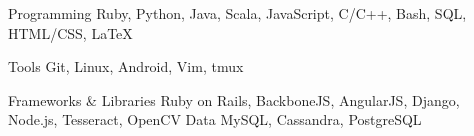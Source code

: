 

\begin{cvskills}

  \cvskill
    {Programming} %
    {Ruby, Python, Java, Scala, JavaScript, C/C++, Bash, SQL, HTML/CSS, LaTeX} %

  \cvskill
    {Tools} %
    {Git, Linux, Android, Vim, tmux} %

  \cvskill
  {Frameworks \& Libraries} %
    {Ruby on Rails, BackboneJS, AngularJS, Django, Node.js, Tesseract, OpenCV } %
  \cvskill
  {Data} %
    {MySQL, Cassandra, PostgreSQL} %
\end{cvskills}
